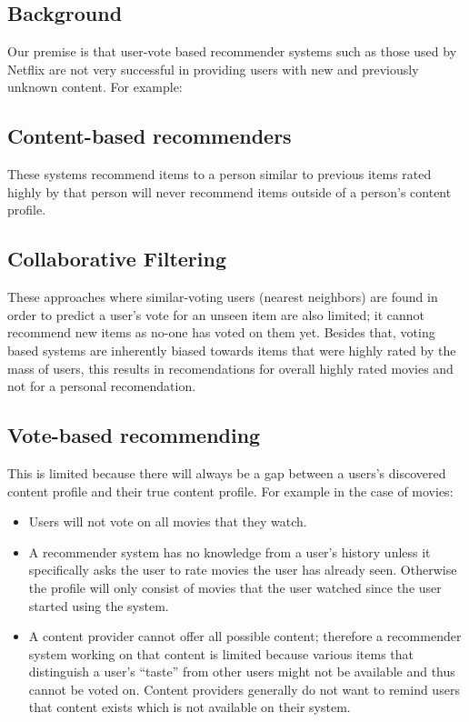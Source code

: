 \subsection{Background}
\label{sec:intro:background}
Our premise is that user-vote based recommender systems such as those used by Netflix are not very successful in
providing users with new and previously unknown content. For example:

\subsection{Content-based recommenders}
These systems recommend items to a person similar to previous items rated highly by
that person will never recommend items outside of a person’s content profile.

\subsection{Collaborative Filtering}
These approaches where similar-voting users (nearest neighbors) are found in order to predict a
user’s vote for an unseen item are also limited; it cannot recommend new items as no-one has voted on them yet.
Besides that, voting based systems are inherently biased towards items that were highly rated by the mass of
users, this results in recomendations for overall highly rated movies and not for a personal recomendation.

\subsection{Vote-based recommending}
This is limited because there will always be a gap between a users’s discovered content
profile and their true content profile. For example in the case of movies:
\begin{itemize}
	\item Users will not vote on all movies that they watch.
	\item A recommender system has no knowledge from a user’s history unless it specifically asks the user to rate
movies the user has already seen. Otherwise the profile will only consist of movies that the user watched
since the user started using the system.
	\item A content provider cannot offer all possible content; therefore a recommender system working on that
content is limited because various items that distinguish a user’s “taste” from other users might not be
available and thus cannot be voted on. Content providers generally do not want to remind users that
content exists which is not available on their system.
\end{itemize}


